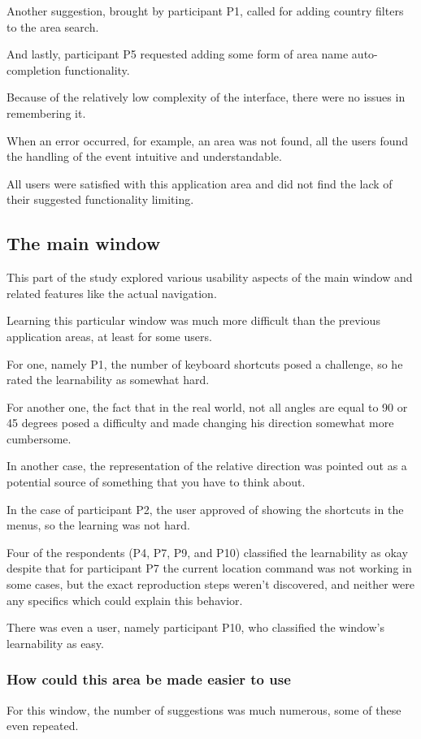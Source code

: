 \documentclass[nolof,digital]{fithesis3}
\begin{document}
Another suggestion, brought by participant P1, called for adding country filters to the area search. 

And lastly, participant P5 requested adding some form of area name auto-completion functionality.

Because of the relatively low complexity of the interface, there were no issues in remembering it.

When an error occurred, for example, an area was not found, all the users found the handling of the event intuitive and understandable.

All users were satisfied with this application area and did not find the lack of their suggested functionality limiting.
\subsection{The main window}
This part of the study explored various usability aspects of the main window and related features like the actual navigation.

Learning this particular window was much more difficult than the previous application areas, at least for some users.

For one, namely P1, the number of keyboard shortcuts posed a challenge, so he rated the learnability as somewhat hard.

For another one, the fact that in the real world, not all angles are equal to 90 or 45 degrees posed a difficulty and made changing his direction somewhat more cumbersome.

In another case, the representation of the relative direction was pointed out as a potential source of something that you have to think about.

In the case of participant P2, the user approved of showing the shortcuts in the menus, so the learning was not hard.

Four of the respondents (P4, P7, P9, and P10) classified the learnability as okay despite that for participant P7 the current location command was not working in some cases, but the exact reproduction steps weren't discovered, and neither were any specifics which could explain this behavior.

There was even a user, namely participant P10, who classified the window's learnability as easy.
\subsubsection{How could this area be made easier to use}
For this window, the number of suggestions was much numerous, some of these even repeated.
\end{document}
